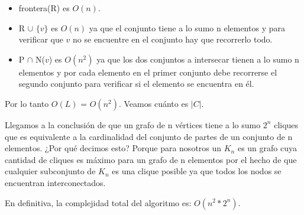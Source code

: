\begin{itemize}
 \item frontera(R) es $O(n)$.
 \item R $\cup$ $\{v\}$ es $O(n)$ ya que el conjunto tiene a lo sumo n elementos y para verificar que $v$ no se encuentre en el conjunto hay que recorrerlo todo.
 \item P $\cap$ N($v$) es $O(n^2)$ ya que los dos conjuntos a intersecar tienen a lo sumo n elementos y por cada elemento en el primer conjunto debe recorrerse el segundo conjunto para verificar si el elemento se encuentra en él.
\end{itemize}

Por lo tanto $O(L)$ = $O(n^2)$. Veamos cuánto es $|C|$.


Llegamos a la conclusión de que un grafo de n vértices tiene a lo sumo $2^n$ cliques que es equivalente a la cardinalidad del conjunto de partes de un conjunto de n elementos. ¿Por qué decimos esto? Porque para nosotros un $K_n$ es un grafo cuya cantidad de cliques es máximo para un grafo de n elementos por el hecho de que cualquier subconjunto de $K_n$ es una clique posible ya que todos los nodos se encuentran interconectados.

En definitiva, la complejidad total del algoritmo es: $O(n^2*2^n)$.



